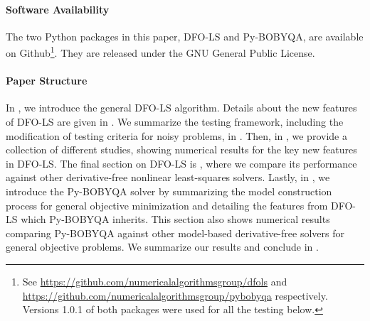 
\paragraph{Software Availability}
The two Python packages in this paper, DFO-LS and Py-BOBYQA, are available on Github\footnote{\:See \url{https://github.com/numericalalgorithmsgroup/dfols} and \url{https://github.com/numericalalgorithmsgroup/pybobyqa} respectively. Versions 1.0.1 of both packages were used for all the testing below.}.
They are released under the GNU General Public License.

\paragraph{Paper Structure}
In , we introduce the general DFO-LS algorithm.
Details about the new features of DFO-LS are given in .
We summarize the testing framework, including the modification of testing criteria for noisy problems, in .
Then, in , we provide a collection of different studies, showing numerical results for the key new features in DFO-LS.
The final section on DFO-LS is , where we compare its performance against other derivative-free nonlinear least-squares solvers.
Lastly, in , we introduce the Py-BOBYQA solver by summarizing the model construction process for general objective minimization and detailing the features from DFO-LS which Py-BOBYQA inherits.
This section also shows numerical results comparing Py-BOBYQA against other model-based derivative-free solvers for general objective problems.
We summarize our results and conclude in .

